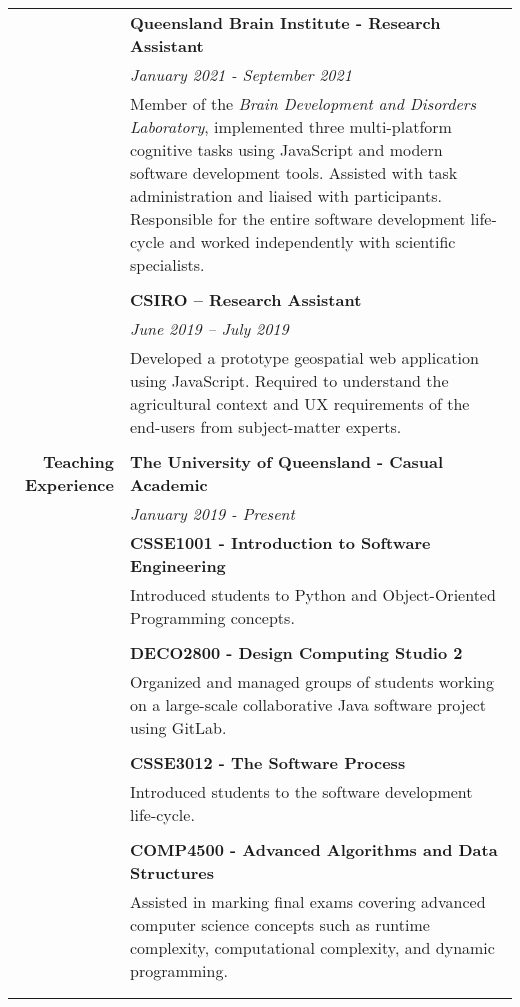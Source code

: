 \documentclass[a4paper]{article}
\begin{document}
\begin{longtable}{r p{13.5cm}}
										\vline & \textbf{Queensland Brain Institute - Research Assistant} \\
										\vline & \textit{January 2021 - September 2021} \\
										\vline & Member of the \textit{Brain Development and Disorders Laboratory}, implemented three multi-platform cognitive tasks using JavaScript and modern software development tools. Assisted with task administration and liaised with participants. Responsible for the entire software development life-cycle and worked independently with scientific specialists. \\ 
										\vline & \\
										\vline & \textbf{CSIRO – Research Assistant} \\
 										\vline & \textit{June 2019 – July 2019} \\
 										\vline & Developed a prototype geospatial web application using JavaScript. Required to understand the agricultural context and UX requirements of the end-users from subject-matter experts. \\
 										\vline & \\
										
	\textbf{Teaching Experience} 	  	\vline & \textbf{The University of Queensland - Casual Academic} \\
										\vline & \textit{January 2019 - Present} \\
										\vline & \textbf{CSSE1001 - Introduction to Software Engineering} \\
										\vline & Introduced students to Python and Object-Oriented Programming concepts. \\
										\vline & \\
										\vline & \textbf{DECO2800 - Design Computing Studio 2} \\
										\vline & Organized and managed groups of students working on a large-scale collaborative Java software project using GitLab. \\
										\vline & \\
										\vline & \textbf{CSSE3012 - The Software Process} \\
										\vline & Introduced students to the software development life-cycle. \\
										\vline & \\
										\vline & \textbf{COMP4500 - Advanced Algorithms and Data Structures} \\
										\vline & Assisted in marking final exams covering advanced computer science concepts such as runtime complexity, computational complexity, and dynamic programming. \\
										\vline & \\
										\vline & \\


\end{longtable}
\end{document}
